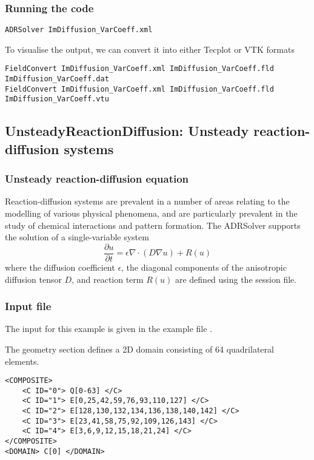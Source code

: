 \subsubsection{Running the code}
\begin{lstlisting}[style=BashInputStyle]
ADRSolver ImDiffusion_VarCoeff.xml
\end{lstlisting}

To visualise the output, we can convert it into either Tecplot or VTK formats
\begin{lstlisting}[style=BashInputStyle]
FieldConvert ImDiffusion_VarCoeff.xml ImDiffusion_VarCoeff.fld ImDiffusion_VarCoeff.dat
FieldConvert ImDiffusion_VarCoeff.xml ImDiffusion_VarCoeff.fld ImDiffusion_VarCoeff.vtu
\end{lstlisting}


\subsection{UnsteadyReactionDiffusion: Unsteady reaction-diffusion systems}

\subsubsection{Unsteady reaction-diffusion equation}
Reaction-diffusion systems are prevalent in a number of areas relating to the
modelling of various physical phenomena, and are particularly prevalent in the
study of chemical interactions and pattern formation. The ADRSolver supports the
solution of a single-variable system
\[
  \frac{\partial u}{\partial t} = \epsilon \nabla \cdot ( D \nabla u) + R(u)
\]
where the diffusion coefficient $\epsilon$, the diagonal components of the anisotropic 
diffusion tensor $D$, and reaction term $R(u)$ are defined using the session file.

\subsubsection{Input file}
The input for this example is given in the example file .

The geometry section defines a 2D domain consisting of 64 quadrilateral elements. 
\begin{lstlisting}[style=XMLStyle]
<COMPOSITE>
    <C ID="0"> Q[0-63] </C>
    <C ID="1"> E[0,25,42,59,76,93,110,127] </C>
    <C ID="2"> E[128,130,132,134,136,138,140,142] </C>
    <C ID="3"> E[23,41,58,75,92,109,126,143] </C>
    <C ID="4"> E[3,6,9,12,15,18,21,24] </C>
</COMPOSITE>
<DOMAIN> C[0] </DOMAIN>
\end{lstlisting}


